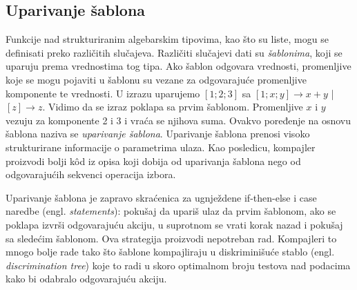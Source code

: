 \subsection{Uparivanje šablona}

 
Funkcije nad strukturiranim algebarskim tipovima, kao što su liste, mogu se definisati preko različitih slučajeva. Različiti slučajevi dati su \textit{šablonima}, koji se uparuju prema vrednostima tog tipa. Ako šablon odgovara vrednosti, promenljive koje se mogu pojaviti u šablonu su vezane za odgovarajuće promenljive komponente te vrednosti. U izrazu uparujemo $[1; 2; 3]$  sa $[1; x; y] \longrightarrow x+y$ |  $[z] \longrightarrow z$. Vidimo da se izraz poklapa sa prvim šablonom. Promenljive $x$ i $y$ vezuju za komponente 2 i 3 i vraća se njihova suma. Ovakvo poređenje na osnovu šablona naziva se \textit{uparivanje šablona}. Uparivanje šablona prenosi visoko strukturirane informacije o parametrima ulaza. Kao posledicu, kompajler proizvodi bolji k\^ od iz opisa koji dobija od uparivanja šablona nego od odgovarajućih sekvenci operacija izbora. %

Uparivanje šablona je zapravo skraćenica za ugnježdene if-then-else i case naredbe (engl. \textit{statements}): pokušaj da upariš ulaz da prvim šablonom, ako se poklapa izvrši odgovarajuću akciju, u suprotnom se vrati korak nazad i pokušaj sa sledećim šablonom. Ova strategija proizvodi nepotreban rad. Kompajleri to mnogo bolje rade tako što šablone kompajliraju u diskriminišuće stablo (engl. \textit{discrimination tree}) koje to radi u skoro optimalnom broju testova nad podacima kako bi odabralo odgovarajuću akciju. 




\iffalse 

\fi



